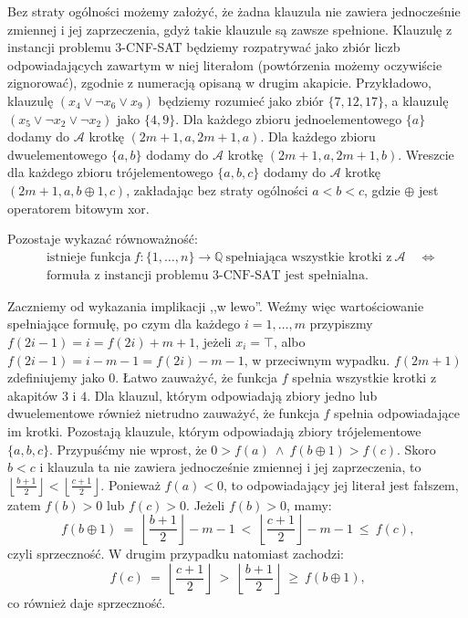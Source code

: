 \documentclass[12pt]{article}
\begin{document}
	\medskip
	
	Bez straty ogólności możemy założyć, że żadna klauzula nie zawiera
	jednocześnie zmiennej i jej zaprzeczenia, gdyż takie klauzule są zawsze
	spełnione. Klauzulę z instancji problemu 3-CNF-SAT będziemy rozpatrywać jako
	zbiór liczb odpowiadających zawartym w niej literałom (powtórzenia możemy
	oczywiście zignorować), zgodnie z numeracją opisaną w drugim akapicie.
	Przykładowo, klauzulę \((x_{4} \vee \neg x_{6} \vee x_{9})\) będziemy
	rozumieć jako zbiór \(\{7, 12, 17\}\), a klauzulę \((x_{5} \vee \neg x_{2}
	\vee \neg x_{2})\) jako \(\{4, 9\}\). Dla każdego zbioru jednoelementowego
	\(\{a\}\) dodamy do \(\mathcal{A}\) krotkę \((2m + 1, a, 2m + 1, a)\). Dla
	każdego zbioru dwuelementowego \(\{a, b\}\) dodamy do \(\mathcal{A}\) krotkę
	\((2m + 1, a, 2m + 1, b)\). Wreszcie dla każdego zbioru trójelementowego
	\(\{a, b, c\}\) dodamy do \(\mathcal{A}\) krotkę \((2m + 1, a, b \oplus 1,
	c)\), zakładając bez straty ogólności \(a < b < c\), gdzie \(\oplus\) jest
	operatorem bitowym xor.
	
	\medskip
	
	Pozostaje wykazać równoważność:
	\begin{align*}
		&\text{istnieje funkcja} \ f : \{1, \ldots, n\} \to \mathbb{Q} \
		\text{spełniająca wszystkie krotki z} \ \mathcal{A} \quad \iff \\
		&\text{formuła z instancji problemu 3-CNF-SAT jest spełnialna.}
	\end{align*}
	
	\medskip
	
	Zaczniemy od wykazania implikacji ,,w lewo''. Weźmy więc wartościowanie
	spełniające formułę, po czym dla każdego \(i = 1, \ldots, m\) przypiszmy
	\(f(2i - 1) = i = f(2i) + m + 1\), jeżeli \(x_{i} = \top\), albo \(f(2i - 1)
	= i - m - 1 = f(2i) - m - 1\), w przeciwnym wypadku. \(f(2m + 1)\)
	zdefiniujemy jako \(0\). Łatwo zauważyć, że funkcja \(f\) spełnia wszystkie
	krotki z akapitów \(3\) i \(4\). Dla klauzul, którym odpowiadają zbiory
	jedno lub dwuelementowe również nietrudno zauważyć, że funkcja \(f\) spełnia
	odpowiadające im krotki. Pozostają klauzule, którym odpowiadają zbiory
	trójelementowe \(\{a, b, c\}\). Przypuśćmy nie wprost, że \(0 > f(a) \
	\wedge \ f(b \oplus 1) > f(c)\). Skoro \(b < c\) i klauzula ta nie zawiera
	jednocześnie zmiennej i jej zaprzeczenia, to \(\left\lfloor \frac{b + 1}{2}
	\right\rfloor < \left\lfloor \frac{c + 1}{2} \right\rfloor\). Ponieważ
	\(f(a) < 0\), to odpowiadający jej literał jest fałszem, zatem \(f(b) > 0\)
	lub \(f(c) > 0\). Jeżeli \(f(b) > 0\), mamy:
	\[ f(b \oplus 1) \ = \ \left\lfloor \frac{b + 1}{2} \right\rfloor - m - 1 \
	< \ \left\lfloor \frac{c + 1}{2} \right\rfloor - m - 1 \ \leqslant \ f(c)
	\text{,} \]
	czyli sprzeczność. W drugim przypadku natomiast zachodzi:
	\[ f(c) \ = \ \left\lfloor \frac{c + 1}{2} \right\rfloor \ > \ \left\lfloor
	\frac{b + 1}{2} \right\rfloor \ \geqslant \ f(b \oplus 1) \text{,} \]
	co również daje sprzeczność.
	
\end{document}
